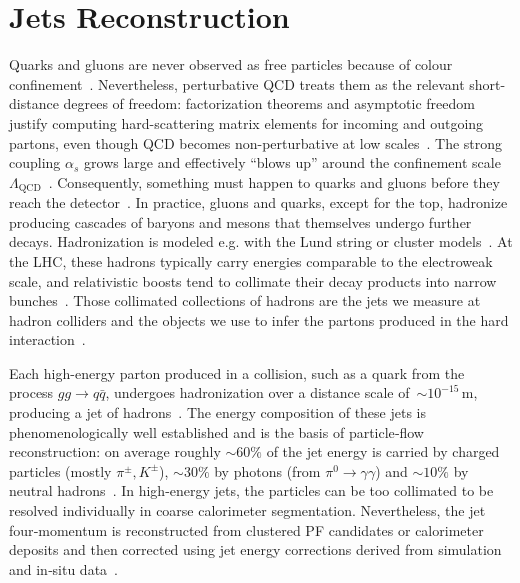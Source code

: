 \section{Jets Reconstruction}\label{sec:jets}

Quarks and gluons are never observed as free particles because of colour confinement~\cite{Andersson:1983,Webber:1984}. Nevertheless, perturbative QCD treats them as the relevant short-distance degrees of freedom: factorization theorems and asymptotic freedom justify computing hard-scattering matrix elements for incoming and outgoing partons, even though QCD becomes non-perturbative at low scales~\cite{Collins:1989}. The strong coupling $\alpha_s$ grows large and effectively ``blows up'' around the confinement scale $\Lambda_{\mathrm{QCD}}$~\cite{1674-1137-40-10-100001}. Consequently, something must happen to quarks and gluons before they reach the detector~\cite{Sjostrand:2014zea}. In practice, gluons and quarks, except for the top, hadronize producing cascades of baryons and mesons that themselves undergo further decays. Hadronization is modeled e.g. with the Lund string or cluster models~\cite{Andersson:1983,Webber:1984,Sjostrand:2014zea}. At the LHC, these hadrons typically carry energies comparable to the electroweak scale, and relativistic boosts tend to collimate their decay products into narrow bunches~\cite{Salam:2010}. Those collimated collections of hadrons are the jets we measure at hadron colliders and the objects we use to infer the partons produced in the hard interaction~\cite{Salam:2010,Cacciari:2008gp}.

Each high-energy parton produced in a collision, such as a quark from the process $gg \rightarrow q\bar{q}$, undergoes hadronization over a distance scale of~$\sim10^{-15}\,\mathrm{m}$, producing a jet of hadrons~\cite{Andersson:1983,Sjostrand:2014zea}. The energy composition of these jets is phenomenologically well established and is the basis of particle‑flow reconstruction: on average roughly $\sim60\%$ of the jet energy is carried by charged particles (mostly $\pi^{\pm}, K^{\pm}$), $\sim30\%$ by photons (from $\pi^0\to\gamma\gamma$) and $\sim10\%$ by neutral hadrons~\cite{CMS:PF2017}. In high-energy jets, the particles can be too collimated to be resolved individually in coarse calorimeter segmentation. Nevertheless, the jet four‑momentum is reconstructed from clustered PF candidates or calorimeter deposits and then corrected using jet energy corrections derived from simulation and in‑situ data~\cite{CMS:PF2017,Cacciari:2011ma,deFavereau:2013fsa}.

